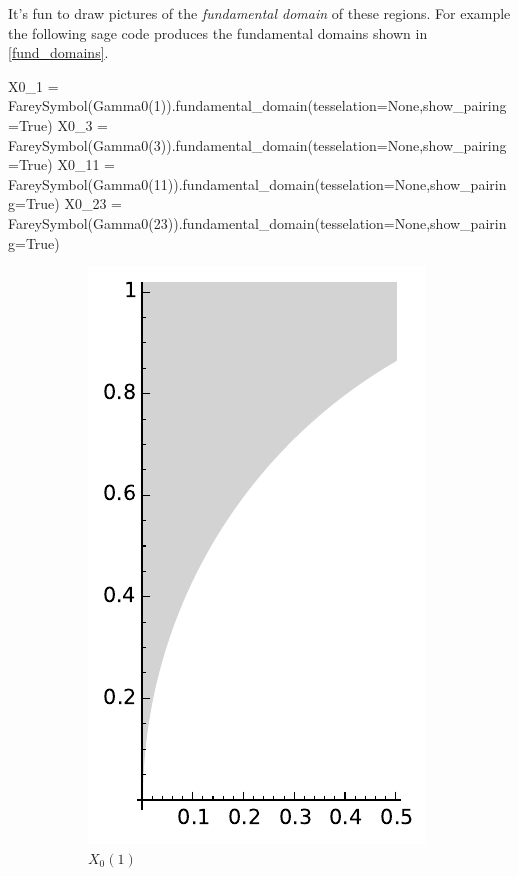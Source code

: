 \documentclass[11pt]{article}
\theoremstyle{plain}
\theoremstyle{remark}
\begin{document}
It's fun to draw pictures of the \emph{fundamental domain} of these regions. For example the following sage code produces the fundamental domains shown in \autoref{fund_domains}.
\begin{sagecode}
\begin{sagecell}
X0_1 = FareySymbol(Gamma0(1)).fundamental_domain(tesselation=None,show_pairing=True)
X0_3 = FareySymbol(Gamma0(3)).fundamental_domain(tesselation=None,show_pairing=True)
X0_11 = FareySymbol(Gamma0(11)).fundamental_domain(tesselation=None,show_pairing=True)
X0_23 = FareySymbol(Gamma0(23)).fundamental_domain(tesselation=None,show_pairing=True)
\end{sagecell}
\end{sagecode}
\begin{figure}
	\begin{subfigure}{.5\linewidth}
	\centering
	\includegraphics[width=0.6\linewidth]{X0_1.pdf}
	\caption{$X_0(1)$\label{X0_1.svg}}
	\end{subfigure}
	\begin{subfigure}{.5\linewidth}
	\centering

\end{subfigure}
\end{figure}
\end{document}
